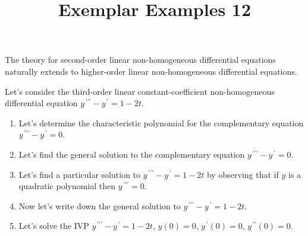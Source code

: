\documentclass{ximera}
\begin{document}
\begin{abstract}
 \end{abstract}

    \title{Exemplar Examples 12}
    
    \maketitle


The theory for second-order linear non-homogeneous differential equations naturally extends to higher-order linear non-homogeneous differential equations.


Let's consider the third-order linear constant-coefficient non-homogeneous differential equation $y^{\,\prime\prime\prime}-y^{\,\prime}=1-2t$.

\begin{enumerate}
  \item  Let's determine the characteristic polynomial for the complementary equation $y^{\,\prime\prime\prime}-y^{\,\prime}=0$.


\vfill


\item Let's find the general solution to the complementary equation $y^{\,\prime\prime\prime}-y^{\,\prime}=0$.



\vfill
\vfill

\item Let's find a particular solution to $y^{\,\prime\prime\prime}-y^{\,\prime}=1-2t$ by observing that if $y$ is a quadratic polynomial then $y^{\,\prime\prime\prime}=0$.


\vfill

\newpage

\item Now let's write down the general solution to $y^{\,\prime\prime\prime}-y^{\,\prime}=1-2t$.



\vfill

\item Let's solve the IVP $y^{\,\prime\prime\prime}-y^{\,\prime}=1-2t$, $y(0)=0$, $y^{\,\prime}(0)=0$, $y^{\,\prime\prime}(0)=0$.








\vfill
\vfill



\end{enumerate}
\end{document}
